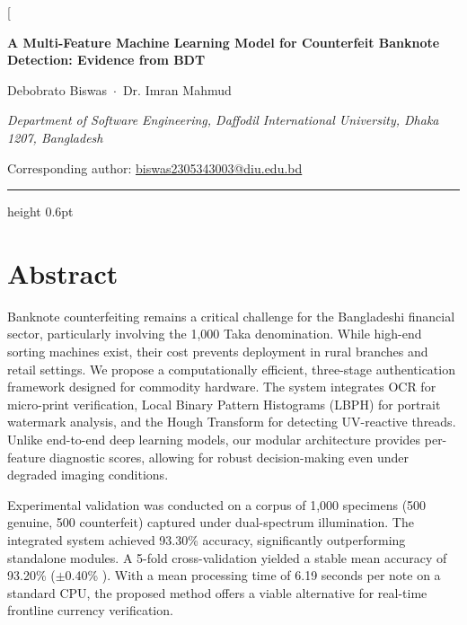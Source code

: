 \documentclass[10pt,a4paper,twocolumn,twoside]{article}
\begin{document}

\twocolumn[{%

\begin{center}

{\fontsize{14}{17}\bfseries\selectfont
A Multi-Feature Machine Learning Model for Counterfeit
Banknote Detection: Evidence from BDT\par}

\vspace{9pt}

{\fontsize{11}{14}\selectfont
Debobrato Biswas \,$\cdot$\, Dr. Imran Mahmud\par}

\vspace{5pt}

{\small\itshape
Department of Software Engineering,
Daffodil International University,
Dhaka 1207, Bangladesh\par
\vspace{2pt}
\textrm{Corresponding author:}
\href{mailto:biswas2305343003@diu.edu.bd}{biswas2305343003@diu.edu.bd}\par}

\vspace{6pt}
\hrule height 0.6pt
\vspace{6pt}

\begin{minipage}{0.98\linewidth}
\small
\section*{Abstract}
Banknote counterfeiting remains a critical challenge for the Bangladeshi financial sector, particularly involving the 1,000 Taka denomination. While high-end sorting machines exist, their cost prevents deployment in rural branches and retail settings. We propose a computationally efficient, three-stage authentication framework designed for commodity hardware. The system integrates OCR for micro-print verification, Local Binary Pattern Histograms (LBPH) for portrait watermark analysis, and the Hough Transform for detecting UV-reactive threads. Unlike end-to-end deep learning models, our modular architecture provides per-feature diagnostic scores, allowing for robust decision-making even under degraded imaging conditions.

Experimental validation was conducted on a corpus of 1,000 specimens (500 genuine, 500 counterfeit) captured under dual-spectrum illumination. The integrated system achieved 93.30\% accuracy, significantly outperforming standalone modules. A 5-fold cross-validation yielded a stable mean accuracy of 93.20\% ($\pm$0.40\% \cite{wilson1927probable}). With a mean processing time of 6.19 seconds per note on a standard CPU, the proposed method offers a viable alternative for real-time frontline currency verification.
\end{minipage}


\end{center}}
\end{document}
